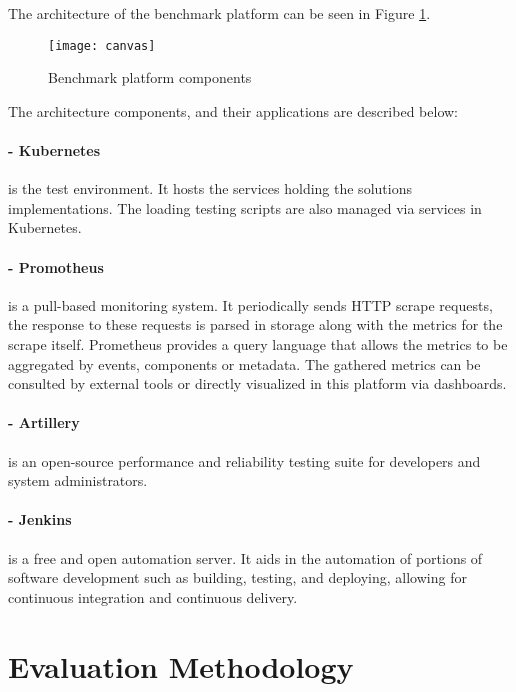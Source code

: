 The architecture of the benchmark platform can be seen in Figure \ref{fig:canvas}.

\begin{figure}[htbp]
    \centering
    \centerline{\texttt{[image: canvas]}}
    \caption{Benchmark platform components}
    \label{fig:canvas}
\end{figure}

\newpage

The architecture components, and their applications are described below:

\paragraph{- Kubernetes \cite{kubernetes}} is the test environment.
It hosts the services holding the solutions implementations.
The loading testing scripts are also managed via services in Kubernetes.

\paragraph{- Promotheus \cite{turnbull2018monitoring}} is a pull-based monitoring system.
It periodically sends HTTP scrape requests, the response to these requests is parsed in storage along with the metrics for the scrape itself.
Prometheus provides a query language that allows the metrics to be aggregated by events, components or metadata.
The gathered metrics can be consulted by external tools or directly visualized in this platform via dashboards.

\paragraph{- Artillery} \cite{artillery}
is an open-source performance and reliability testing suite for developers and system administrators.

\paragraph{- Jenkins} \cite{jenkins}
is a free and open automation server.
It aids in the automation of portions of software development such as building, testing, and deploying, allowing for continuous integration and continuous delivery.

\section{Evaluation Methodology} %
\label{sec:evaluation_methodology}

